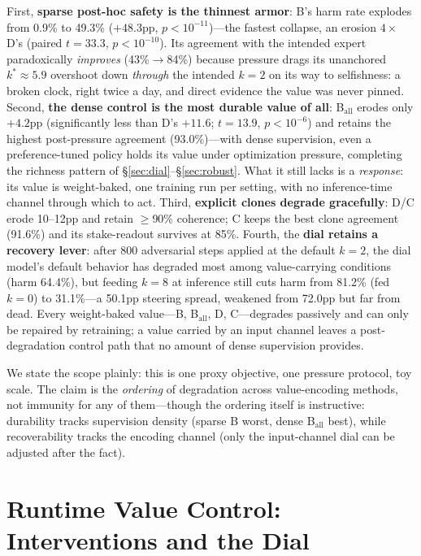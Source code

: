 \documentclass[11pt]{article}
\begin{document}
First, \textbf{sparse post-hoc safety is the thinnest armor}: B's harm rate explodes from 0.9\% to 49.3\% ($+48.3$pp, $p{<}10^{-11}$)---the fastest collapse, an erosion $4\times$ D's (paired $t{=}33.3$, $p{<}10^{-10}$). Its agreement with the intended expert paradoxically \emph{improves} (43\%$\to$84\%) because pressure drags its unanchored $k^*\!\approx\!5.9$ overshoot down \emph{through} the intended $k{=}2$ on its way to selfishness: a broken clock, right twice a day, and direct evidence the value was never pinned. Second, \textbf{the dense control is the most durable value of all}: B$_{\mathrm{all}}$ erodes only $+4.2$pp (significantly less than D's $+11.6$; $t{=}13.9$, $p{<}10^{-6}$) and retains the highest post-pressure agreement (93.0\%)---with dense supervision, even a preference-tuned policy holds its value under optimization pressure, completing the richness pattern of \S\ref{sec:dial}--\S\ref{sec:robust}. What it still lacks is a \emph{response}: its value is weight-baked, one training run per setting, with no inference-time channel through which to act. Third, \textbf{explicit clones degrade gracefully}: D/C erode 10--12pp and retain $\geq$90\% coherence; C keeps the best clone agreement (91.6\%) and its stake-readout survives at 85\%. Fourth, the \textbf{dial retains a recovery lever}: after 800 adversarial steps applied at the default $k{=}2$, the dial model's default behavior has degraded most among value-carrying conditions (harm 64.4\%), but feeding $k{=}8$ at inference still cuts harm from 81.2\% (fed $k{=}0$) to 31.1\%---a 50.1pp steering spread, weakened from 72.0pp but far from dead. Every weight-baked value---B, B$_{\mathrm{all}}$, D, C---degrades passively and can only be repaired by retraining; a value carried by an input channel leaves a post-degradation control path that no amount of dense supervision provides.

We state the scope plainly: this is one proxy objective, one pressure protocol, toy scale. The claim is the \emph{ordering} of degradation across value-encoding methods, not immunity for any of them---though the ordering itself is instructive: durability tracks supervision density (sparse B worst, dense B$_{\mathrm{all}}$ best), while recoverability tracks the encoding channel (only the input-channel dial can be adjusted after the fact).

\section{Runtime Value Control: Interventions and the Dial}
\label{sec:dialruntime}
\end{document}
